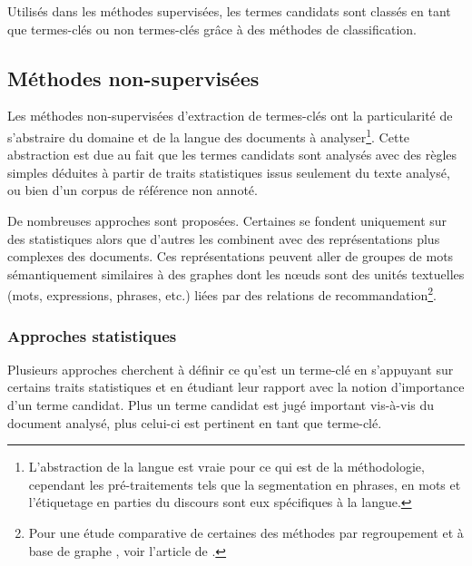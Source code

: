   Utilisés dans les méthodes supervisées, les termes candidats sont classés en
  tant que termes-clés ou non termes-clés grâce à des méthodes de
  classification.

  \subsection{Méthodes non-supervisées}
  \label{sec:unsupervised_methods}
    Les méthodes non-supervisées d'extraction de termes-clés ont la
    particularité de s'abstraire du domaine et de la langue des documents à
    analyser\footnote{L'abstraction de la langue est vraie pour ce qui est de la
    méthodologie, cependant les pré-traitements tels que la segmentation en
    phrases, en mots et l'étiquetage en parties du discours sont eux spécifiques
    à la langue.}. Cette abstraction est due au fait que les termes candidats
    sont analysés avec des règles simples déduites à partir de traits
    statistiques issus seulement du texte analysé, ou bien d'un corpus de
    référence non annoté.

    De nombreuses approches sont proposées. Certaines se fondent uniquement sur
    des statistiques alors que d'autres les combinent avec des représentations
    plus complexes des documents. Ces représentations peuvent aller de groupes
    de mots sémantiquement similaires à des graphes dont les n\oe{}uds sont des
    unités textuelles (mots, expressions, phrases, etc.) liées par des
    relations de recommandation\footnote{Pour une étude comparative de certaines
    des méthodes par regroupement \citep{liu2009keycluster} et à base de graphe
    \citep{mihalcea2004textrank, wan2008expandrank}, voir l'article de
    \citet{hassan2010conundrums}.}.

    \subsubsection{Approches statistiques}
      Plusieurs approches cherchent à définir ce qu'est un terme-clé en
      s'appuyant sur certains traits statistiques et en étudiant leur rapport
      avec la notion d'importance d'un terme candidat. Plus un terme candidat
      est jugé important vis-à-vis du document analysé, plus celui-ci est
      pertinent en tant que terme-clé.

